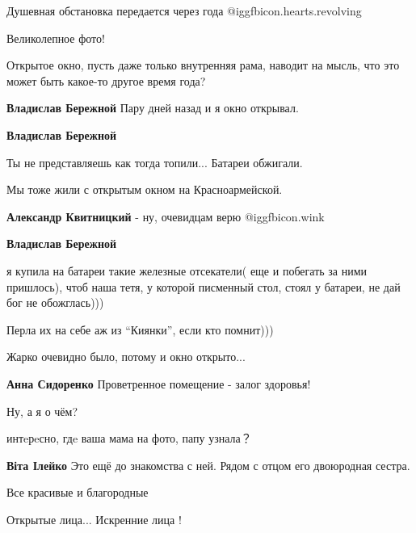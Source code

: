  
 
 
 
 

Душевная обстановка передается через года  @igg{fbicon.hearts.revolving} 

Великолепное фото!


Открытое окно, пусть даже только внутренняя рама, наводит на мысль, что это
может быть какое-то другое время года?

\textbf{Владислав Бережной} Пару дней назад и я окно открывал.

\textbf{Владислав Бережной} 

Ты не представляешь как тогда топили... Батареи обжигали.

Мы тоже жили с открытым окном на Красноармейской.

\textbf{Александр Квитницкий} - ну, очевидцам верю  @igg{fbicon.wink} 

\textbf{Владислав Бережной} 

я купила на батареи такие железные отсекатели( еще и побегать за ними
пришлось), чтоб наша тетя, у которой писменный стол, стоял у батареи, не дай
бог не обожглась)))

Перла их на себе аж из \enquote{Киянки}, если кто помнит)))

Жарко очевидно было, потому и окно открыто...

\textbf{Анна Сидоренко} Проветренное помещение - залог здоровья!

Ну, а я о чём?

интeрeсно, гдe ваша мама на фото, папу узнала？

\textbf{Віта Ілейко} Это ещё до знакомства с ней. Рядом с отцом его двоюродная сестра.

Все красивые и благородные

Открытые лица...
Искренние лица !
